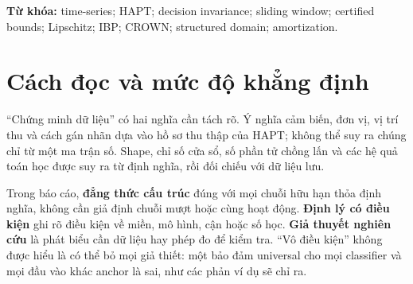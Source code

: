 \documentclass[11pt,a4paper]{article}
\newcommand{\R}{\mathbb R}
\theoremstyle{remark}
\begin{document}
\begin{abstract}
ECDR nghiên cứu điều kiện cho phép trả lại quyết định của một neural
classifier đã cố định mà không tính lại toàn bộ classifier cho mỗi cửa sổ
cảm biến. Báo cáo phát triển lập luận theo ba bước: xác định bài toán và
phạm vi bảo đảm; định nghĩa dữ liệu từ đại lượng vật lý đến cửa sổ và toán
tử dịch; xây dựng các điều kiện chứng nhận trên miền đầu vào. Đối với HAPT,
sáu kênh với 128 mẫu tạo một điểm trong $\R^{768}$; phép dịch 64 mẫu giữ
nguyên 384 giá trị sau căn chỉnh và đưa vào 384 giá trị mới. Đẳng thức này
không suy ra khoảng cách tọa độ nhỏ hoặc bất biến phân loại. Báo cáo chứng
minh điều kiện margin, certificate Lipschitz, tính sound của IBP theo lớp,
các support function cho miền có cấu trúc, định lý dịch đặc trưng cho CNN
valid--ReLU--GAP, và hai quy tắc reuse nhiều bước có điều kiện. Các phản ví dụ
làm rõ vì sao overlap, cùng nhãn hoạt động, cùng miền ReLU hoặc membership
đơn lẻ đều chưa đủ. Phân tích chi phí đưa ra bất đẳng thức hòa vốn, không
khẳng định speedup. Hệ thống giả thuyết cuối báo cáo phân biệt kết quả đại
số, kết quả phụ thuộc giả thiết và câu hỏi còn mở. Mô hình cũ trong repo
được xem là hồ sơ lịch sử; nó không quyết định kiến trúc lý thuyết mới.
\end{abstract}
\textbf{Từ khóa:} time-series; HAPT; decision invariance; sliding window;
certified bounds; Lipschitz; IBP; CROWN; structured domain; amortization.

\tableofcontents
\clearpage
\section*{Cách đọc và mức độ khẳng định}
``Chứng minh dữ liệu'' có hai nghĩa cần tách rõ. Ý nghĩa cảm biến, đơn vị,
vị trí thu và cách gán nhãn dựa vào hồ sơ thu thập của HAPT; không thể suy ra
chúng chỉ từ một ma trận số. Shape, chỉ số cửa sổ, số phần tử chồng lấn và
các hệ quả toán học được suy ra từ định nghĩa, rồi đối chiếu với dữ liệu lưu.

Trong báo cáo, \textbf{đẳng thức cấu trúc} đúng với mọi chuỗi hữu hạn thỏa
định nghĩa, không cần giả định chuỗi mượt hoặc cùng hoạt động.
\textbf{Định lý có điều kiện} ghi rõ điều kiện về miền, mô hình, cận hoặc
số học. \textbf{Giả thuyết nghiên cứu} là phát biểu cần dữ liệu hay phép đo
để kiểm tra. ``Vô điều kiện'' không được hiểu là có thể bỏ mọi giả thiết:
một bảo đảm universal cho mọi classifier và mọi đầu vào khác anchor là sai,
như các phản ví dụ sẽ chỉ ra.
\end{document}
